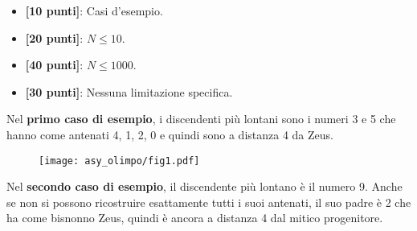 \begin{itemize}[nolistsep,itemsep=2mm]
  \item \textbf{ [10 punti]}: Casi d'esempio.
  \item \textbf{ [20 punti]}: $N \leq 10$.
  \item \textbf{ [40 punti]}: $N \leq 1000$.
  \item \textbf{ [30 punti]}: Nessuna limitazione specifica.
\end{itemize}

\Examples
\begin{example}
%
%
\end{example}


\Explanation
Nel \textbf{primo caso di esempio}, i discendenti più lontani sono i numeri 3 e 5 che hanno come antenati 4, 1, 2, 0 e quindi sono a distanza 4 da Zeus.\\[2mm]

\begin{figure}[H]%
\centering\texttt{[image: asy\_olimpo/fig1.pdf]}%
\end{figure}

Nel \textbf{secondo caso di esempio}, il discendente più lontano è il numero 9. Anche se non si possono ricostruire esattamente tutti i suoi antenati, il suo padre è 2 che ha come bisnonno Zeus, quindi è ancora a distanza 4 dal mitico progenitore.

